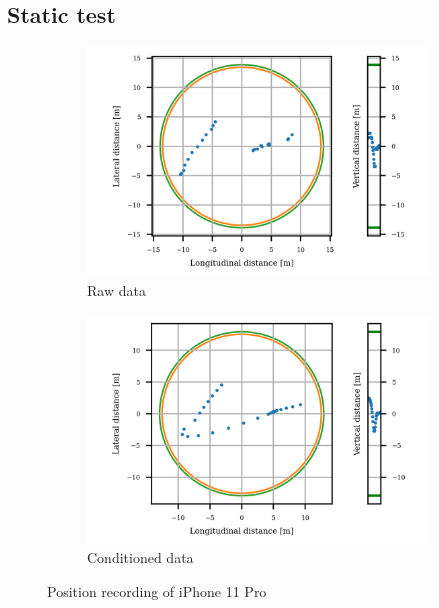 \documentclass{article}
\begin{document}
		\subsection{Static test}
			\begin{figure}[h]
		   		\centering
		     	\begin{subfigure}[b]{0.45\textwidth}
		      		\centering
		      	  	\includegraphics[width=\textwidth]{Static/raw_static_IPhone 11 Pro.png}
		      	  	\caption{Raw data}
		     	\end{subfigure}
		     	\begin{subfigure}[b]{0.45\textwidth}
		      	   \centering
		      	   \includegraphics[width=\textwidth]{Static/cond_static_IPhone 11 Pro.png}
		      	   \caption{Conditioned data}
		     	\end{subfigure}
		     	
		      \caption{Position recording of iPhone 11 Pro}
		      \label{fig:static_loc_iPhone}
			\end{figure}		
\end{document}
